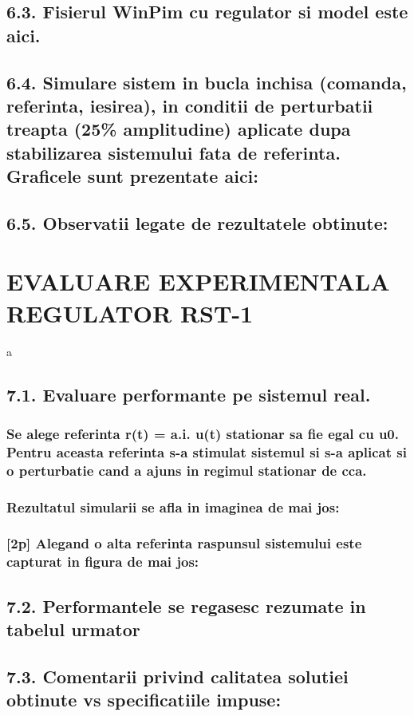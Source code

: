 \documentclass[12pt,english]{article}
\begin{document}
\subsection {6.3. Fisierul WinPim cu regulator si model este aici. }
\subsection {6.4. Simulare sistem in bucla inchisa (comanda, referinta, iesirea), in conditii de perturbatii treapta (25\% amplitudine) aplicate dupa stabilizarea sistemului fata de referinta. Graficele sunt prezentate aici: }
\subsection {6.5. Observatii legate de rezultatele obtinute: }

\section {EVALUARE EXPERIMENTALA REGULATOR RST-1 }
a
\subsection {7.1. Evaluare performante pe sistemul real. }
\subsubsection {Se alege referinta r(t) = a.i. u(t) stationar sa fie egal cu u0. Pentru aceasta referinta s-a stimulat sistemul si s-a aplicat si o perturbatie cand a ajuns in regimul stationar de cca.}
\subsubsection {Rezultatul simularii se afla in imaginea de mai jos: }
\subsubsection {[2p] Alegand o alta referinta raspunsul sistemului este capturat in figura de mai jos: }
\subsection {7.2. Performantele se regasesc rezumate in tabelul urmator }
\subsection {7.3. Comentarii privind calitatea solutiei obtinute vs specificatiile impuse: }
\end{document}
